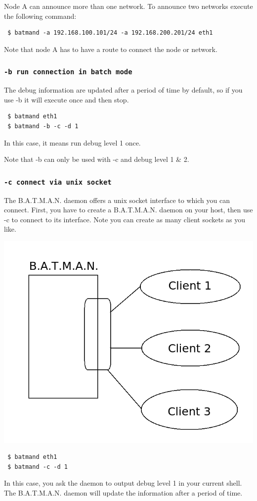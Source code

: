 \documentclass[
	12pt,
	a4paper,
	twoside,
	english,
	headsepline,
	footnosepline,
	automark,
	normalheadings,
	openany,
	cleardoubleplain,
	abstracton,
	idxtotoc,
	liststotoc,
	bibtotoc,
 	BCOR8mm,
]{scrartcl}
\newcommand{\subsubsectionttt}[1]{\subsubsection{\texttt{#1}}}
\begin{document}
Node A can announce more than one network. To announce two networks execute the
following command:
\begin{verbatim}
 $ batmand -a 192.168.100.101/24 -a 192.168.200.201/24 eth1
\end{verbatim}
Note that node A has to have a route to connect the node or network.

\subsubsectionttt{-b run connection in batch mode}
The debug information are updated after a period of time by default, so if you
use -b it will execute once and then stop.
\begin{verbatim}
 $ batmand eth1
 $ batmand -b -c -d 1
\end{verbatim}
In this case, it means run debug level 1 once.

Note that -b can only be used with -c and debug level 1 \& 2.

\subsubsectionttt{-c connect via unix socket}
The B.A.T.M.A.N. daemon offers a unix socket interface to which you can connect.
First, you have to create a B.A.T.M.A.N. daemon on your host, then use -c to
connect to its interface. Note you can create as many client sockets as you
like.

\begin{center}
\includegraphics[scale=0.5]{multiple_clients}
\end{center}

\begin{verbatim}
 $ batmand eth1
 $ batmand -c -d 1
\end{verbatim}
In this case, you ask the daemon to output debug level 1 in your current shell.
The B.A.T.M.A.N. daemon will update the information after a period of time.
\end{document}
